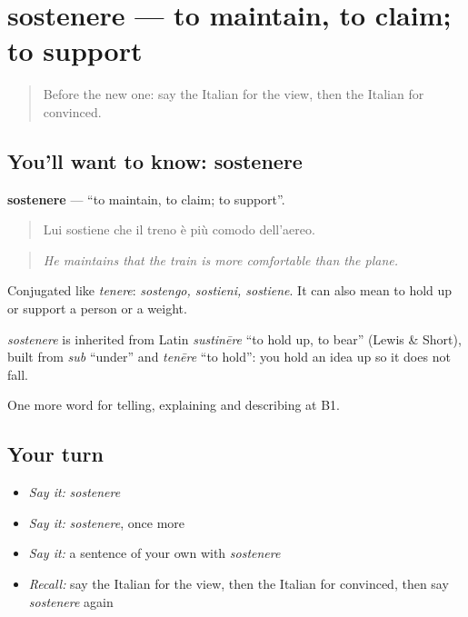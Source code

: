 \section[sostenere]{sostenere — to maintain, to claim; to support}

\label{lesson:IT-C339-sostenere}



\begin{quote}
Before the new one: say the Italian for the view, then the Italian for convinced.
\end{quote}

\subsection*{You'll want to know: sostenere}
\textbf{sostenere} — \textquotedblleft{}to maintain, to claim; to support\textquotedblright{}.

\begin{quote}
Lui sostiene che il treno è più comodo dell'aereo.
\end{quote}

\begin{quote}
\emph{He maintains that the train is more comfortable than the plane.}
\end{quote}

Conjugated like \emph{tenere}: \emph{sostengo, sostieni, sostiene}. It can also mean to hold up or support a person or a weight.

\begin{cousinweb}
\emph{sostenere} is inherited from Latin \emph{sustinēre} \textquotedblleft{}to hold up, to bear\textquotedblright{} (Lewis \& Short), built from \emph{sub} \textquotedblleft{}under\textquotedblright{} and \emph{tenēre} \textquotedblleft{}to hold\textquotedblright{}: you hold an idea up so it does not fall.
\end{cousinweb}

\begin{grammarlens}[title={What you've built}]
One more word for telling, explaining and describing at B1.
\end{grammarlens}

\subsection*{Your turn}
\begin{itemize}
\raggedright
  \item \emph{Say it:} \emph{sostenere}
  \item \emph{Say it:} \emph{sostenere}, once more
  \item \emph{Say it:} a sentence of your own with \emph{sostenere}
  \item \emph{Recall:} say the Italian for the view, then the Italian for convinced, then say \emph{sostenere} again
\end{itemize}

